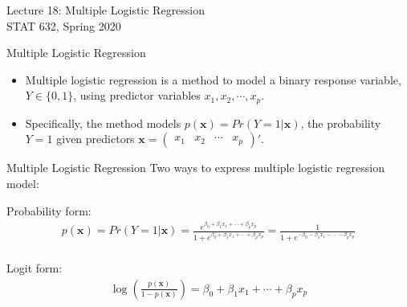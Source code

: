 \documentclass[10pt]{beamer}\usepackage[]{graphicx}\usepackage[]{color}
\begin{document}
\setlength\parindent{0pt}

\begin{frame}
\large
Lecture 18: Multiple Logistic Regression\\
STAT 632, Spring 2020\\
\end{frame}

\begin{frame}{Multiple Logistic Regression}
\begin{itemize}
\item Multiple logistic regression is a method to model a binary response variable, $Y \in \{0,1\}$, using predictor variables $x_1, x_2, \cdots, x_p$.\\
\vspace{10pt}
\item Specifically, the method models $p(\bm{x}) = Pr(Y=1|\bm{x})$, the probability $Y=1$ given predictors $\bm{x} = \begin{pmatrix} x_1 & x_2 & \cdots & x_p \end{pmatrix} '$.  
\end{itemize}
\end{frame}

\begin{frame}{Multiple Logistic Regression}
Two ways to express multiple logistic regression model:\\
\vspace{20pt}

Probability form:
\begin{align*}
p(\bm{x}) = Pr(Y=1 | \bm{x})
= \frac{e^{\beta_0 + \beta_1 x_1 + \cdots + \beta_p x_p}}{1 + e^{\beta_0 + \beta_1 x_1 + \cdots + \beta_p x_p}}
= \frac{1}{1 + e^{-\beta_0 - \beta_1 x_1 - \cdots - \beta_p x_p}}\\
\end{align*}

Logit form:
\begin{align*}
\log\left( \frac{p(\bm{x})}{1-p(\bm{x})} \right) = \beta_0 + \beta_1 x_1 + \cdots + \beta_p x_p
\end{align*}
\end{frame}
\end{document}
